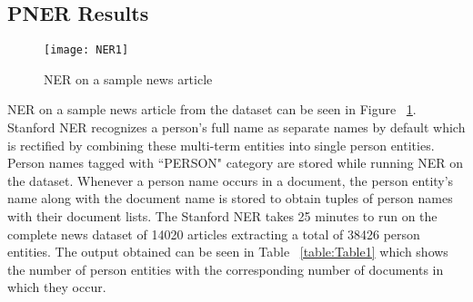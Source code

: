 \subsection{PNER Results}
\label{ner:results}
\begin{figure}[h]
  \centering
\texttt{[image: NER1]}
\caption{NER on a sample news article}
\label{figure:sample}
\end{figure} 




NER on a sample news article from the dataset can be seen in Figure ~\ref{figure:sample}.
 Stanford NER recognizes a person's full name as separate names by default which is rectified by combining these multi-term entities into single person entities. Person names tagged with ``PERSON" category are stored while running NER on the dataset.
Whenever a person name occurs in a document, the person entity's name along with the document name is stored to obtain tuples of person names with their document lists.
The Stanford NER takes 25 minutes to run on the complete news dataset of 14020 articles extracting a total of 38426 person entities. The output obtained can be seen in Table ~\ref{table:Table1} which shows the number of person entities with the corresponding number of documents in which they occur.  


